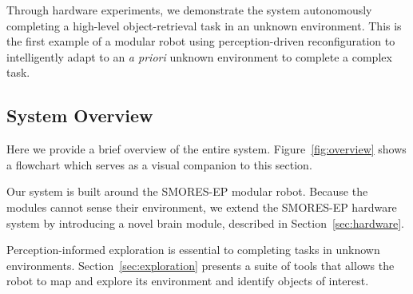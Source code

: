 \documentclass[conference]{IEEEtran}
\begin{document}
Through hardware experiments, we demonstrate the system autonomously completing a high-level object-retrieval task in an unknown environment. This is the first example of a modular robot using perception-driven reconfiguration to intelligently adapt to an \emph{a priori} unknown environment to complete a complex task.


%
\subsection{System Overview}
%
Here we provide a brief overview of the entire system.  Figure~\ref{fig:overview} shows a flowchart which serves as a visual companion to this section. 

Our system is built around the SMORES-EP modular robot. Because the modules cannot sense their environment, we extend the SMORES-EP hardware system by introducing a novel brain module, described in Section~\ref{sec:hardware}.

Perception-informed exploration is essential to completing tasks in unknown environments.  Section~\ref{sec:exploration} presents a suite of tools that allows the robot to map and explore its environment and identify objects of interest. 
\end{document}
